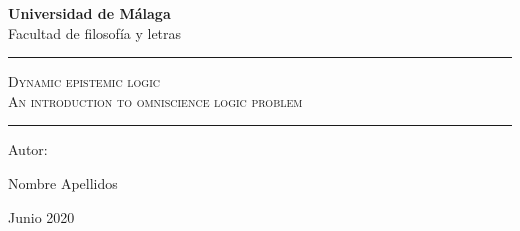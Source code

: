 \documentclass[a4paper]{book}
\begin{document}
\begin{titlepage}
\pagecolor{clarito}
\color{rojo}
	\centering
	{\LARGE \textbf{Universidad de Málaga}} \\
	\vspace{0.5cm}
	{\Large Facultad de filosofía y letras} \\
	\vspace{2cm}
	\hrule
	\vspace{1cm}
	{\Huge  \textsc{Dynamic epistemic logic}}\\
	\vspace{0.5cm}
	{\Large \textsc{An introduction to  omniscience logic problem}}
	\vspace{1cm}
	\hrule
	\vspace{1cm}
	\begin{figure}[!h]
		\centering
	\end{figure}
	\vfill
	{\Large Autor: \par}
	{\Large Nombre Apellidos \par}
	\vfill
	{\Large Junio 2020 \par}

\end{titlepage}
\end{document}
